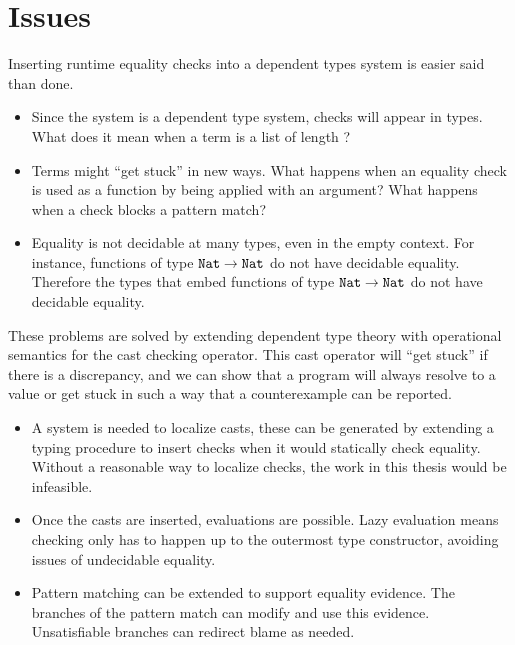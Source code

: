 \section{Issues}

Inserting runtime equality checks into a dependent types system is easier said than done.
\begin{itemize}
\item Since the system is a \fullSp{} dependent type system, checks will appear in types.
What does it mean when a term is a list of length \True{}?
\item Terms might ``get stuck'' in new ways. 
What happens when an equality check is used as a function by being applied with an argument?
What happens when a check blocks a pattern match?
\item Equality is not decidable at many types, even in the empty context.
For instance, functions of type $\mathtt{Nat}{} \rightarrow \mathtt{Nat}{}$ do not have decidable equality.
Therefore the types that embed functions of type $\mathtt{Nat}{} \rightarrow \mathtt{Nat}{}$ do not have decidable equality.
\end{itemize}

These problems are solved by extending dependent type theory with operational semantics for the cast checking operator.
This cast operator will ``get stuck'' if there is a discrepancy, and we can show that a program will always resolve to a value or get stuck in such a way that a counterexample can be reported.

\begin{itemize}
\item A system is needed to localize casts, these can be generated by extending a \textbf{\bidir{}} typing procedure to insert checks when it would statically check equality.
Without a reasonable way to localize checks, the work in this thesis would be infeasible.
\item Once the casts are inserted, evaluations are possible.
Lazy evaluation means checking only has to happen up to the outermost type constructor, avoiding issues of undecidable equality.
\item Pattern matching can be extended to support equality evidence.
The branches of the pattern match can modify and use this evidence.
Unsatisfiable branches can redirect blame as needed.
\end{itemize}

